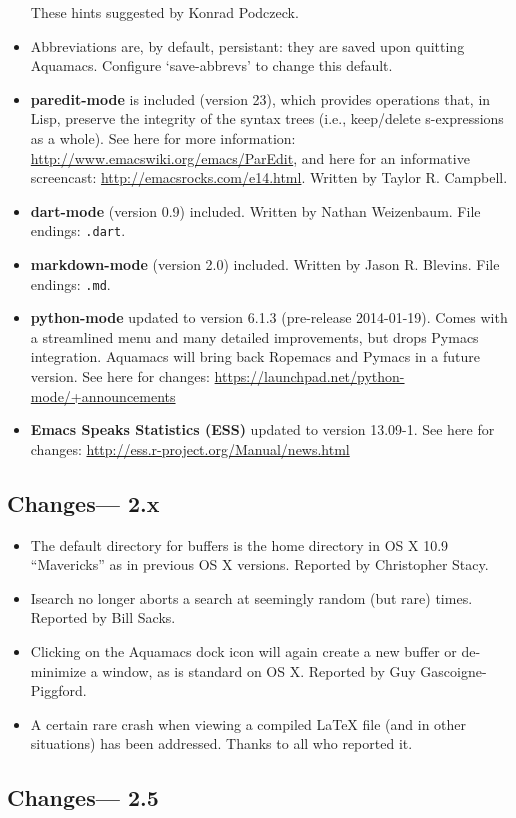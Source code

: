 \begin{itemize}
These hints suggested by Konrad Podczeck.
\item Abbreviations are, by default, persistant: they are saved upon quitting Aquamacs.  Configure `save-abbrevs' to change this default.
\item {\bf paredit-mode} is included (version 23), which provides operations that, in Lisp, preserve the integrity of the syntax trees (i.e., keep/delete s-expressions as a whole).  See here for more information: \url{http://www.emacswiki.org/emacs/ParEdit}, and here for an informative screencast: \url{http://emacsrocks.com/e14.html}.
Written by Taylor R. Campbell.
\item {\bf dart-mode} (version 0.9) included.  Written by Nathan Weizenbaum. File endings: {\tt .dart}.
\item {\bf markdown-mode} (version 2.0) included.  Written by Jason R. Blevins. File endings: {\tt .md}.
\item {\bf python-mode} updated to version 6.1.3 (pre-release 2014-01-19).  Comes with a streamlined menu and many detailed improvements, but drops Pymacs integration.  Aquamacs will bring back Ropemacs and Pymacs in a future version.  See here for changes: \url{https://launchpad.net/python-mode/+announcements}
\item {\bf Emacs Speaks Statistics (ESS)} updated to version 13.09-1. See here for changes: \url{http://ess.r-project.org/Manual/news.html}
\end{itemize}
\subsection{Changes--- 2.x}

\begin{itemize}
\item The default directory for buffers is the home directory in OS X 10.9 ``Mavericks'' as in previous OS X versions.
Reported by Christopher Stacy.
\item Isearch no longer aborts a search at seemingly random (but rare) times.  Reported by Bill Sacks.
\item Clicking on the Aquamacs dock icon will again create a new buffer or de-minimize a window, as is standard on OS X.
Reported by Guy Gascoigne-Piggford.
\item A certain rare crash when viewing a compiled LaTeX file (and in other situations) has been addressed.  Thanks to all who reported it.
\end{itemize}

\subsection{Changes--- 2.5}

